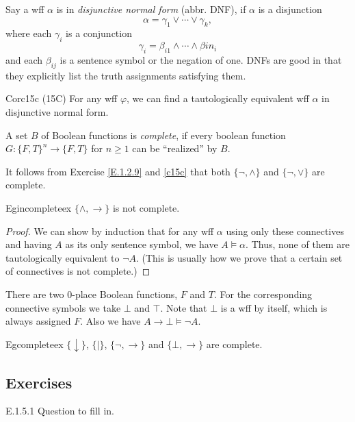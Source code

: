 Say a wff $\alpha$ is in \textit{disjunctive normal form} (abbr. DNF), if $\alpha$ is a disjunction
\[
  \alpha=\gamma_1\vee\cdots\vee \gamma_k,
\]
where each $\gamma_i$ is a conjunction
\[
  \gamma_i=\beta_{i1}\wedge\cdots\wedge \beta{in_i}
\]
and each $\beta_{ij}$ is a sentence symbol or the negation of one. DNFs are good in that they explicitly list the truth assignments satisfying them.

\begin{reference}{Cor}{c15c}
  (15C) For any wff $\varphi$, we can find a tautologically equivalent wff $\alpha$ in disjunctive normal form.
\end{reference}

A set $B$ of Boolean functions is \textit{complete}, if every boolean function $G:\{F,T\}^n\rightarrow\{F,T\}$ for $n\geq 1$ can be ``realized'' by $B$.

It follows from Exercise \ref{E.1.2.9} and \ref{c15c} that both $\{\neg,\wedge\}$ and $\{\neg,\vee\}$ are complete.

\begin{reference}{Eg}{incompleteex}
  $\{\wedge,\rightarrow\}$ is not complete.
\end{reference}

\begin{proof}
  We can show by induction that for any wff $\alpha$ using only these connectives and having $A$ as its only sentence symbol, we have $A\vDash \alpha$. Thus, none of them are tautologically equivalent to $\neg A$. (This is usually how we prove that a certain set of connectives is not complete.)
\end{proof}

There are two $0$-place Boolean functions, $F$ and $T$. For the corresponding connective symbols we take $\bot$ and $\top$. Note that $\bot$ is a wff by itself, which is always assigned $F$. Also we have $A\rightarrow\bot\vDash\neg A$.

\begin{reference}{Eg}{completeex}
  $\{\downarrow\}$, $\{|\}$, $\{\neg,\rightarrow\}$ and $\{\bot,\rightarrow\}$ are complete.
\end{reference}

\subsection*{Exercises}

\begin{exercise}{E.1.5.1}
  Question to fill in.
\end{exercise}

